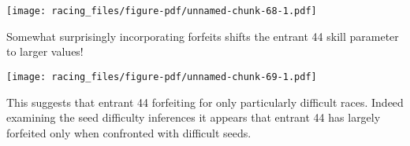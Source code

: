 \documentclass[
  letterpaper,
  DIV=11,
  numbers=noendperiod]{scrartcl}
\newenvironment{Shaded}{\begin{snugshade}}{\end{snugshade}}
\newcommand{\AttributeTok}[1]{\textcolor[rgb]{0.40,0.45,0.13}{#1}}
\newcommand{\ConstantTok}[1]{\textcolor[rgb]{0.56,0.35,0.01}{#1}}
\newcommand{\DecValTok}[1]{\textcolor[rgb]{0.68,0.00,0.00}{#1}}
\newcommand{\FloatTok}[1]{\textcolor[rgb]{0.68,0.00,0.00}{#1}}
\newcommand{\FunctionTok}[1]{\textcolor[rgb]{0.28,0.35,0.67}{#1}}
\newcommand{\NormalTok}[1]{\textcolor[rgb]{0.00,0.23,0.31}{#1}}
\newcommand{\SpecialCharTok}[1]{\textcolor[rgb]{0.37,0.37,0.37}{#1}}
\newcommand{\StringTok}[1]{\textcolor[rgb]{0.13,0.47,0.30}{#1}}
\begin{document}
\texttt{[image: racing\_files/figure-pdf/unnamed-chunk-68-1.pdf]}

Somewhat surprisingly incorporating forfeits shifts the entrant 44 skill
parameter to larger values!

\begin{Shaded}
\end{Shaded}

\texttt{[image: racing\_files/figure-pdf/unnamed-chunk-69-1.pdf]}

This suggests that entrant 44 forfeiting for only particularly difficult
races. Indeed examining the seed difficulty inferences it appears that
entrant 44 has largely forfeited only when confronted with difficult
seeds.
\end{document}
